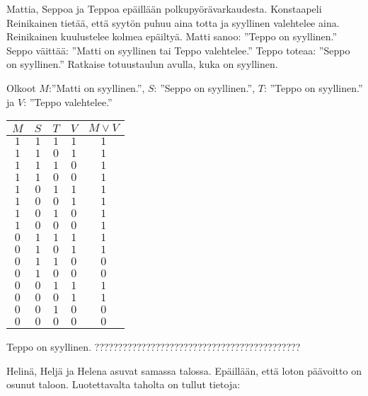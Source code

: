 \begin{kotitehtavasivu}
\begin{tehtava}
\end{tehtava}

\begin{tehtava}
     Mattia, Seppoa ja Teppoa epäillään polkupyörävarkaudesta. Konstaapeli Reinikainen tietää, että syytön puhuu aina totta ja syyllinen valehtelee aina. Reinikainen kuulustelee kolmea epäiltyä. Matti sanoo: ''Teppo on syyllinen.'' Seppo väittää: ''Matti on syyllinen tai Teppo valehtelee.'' Teppo toteaa: ''Seppo on syyllinen.'' Ratkaise totuustaulun avulla, kuka on syyllinen. 
    \begin{vastaus}
      Olkoot $M$:''Matti on syyllinen.'', $S$: ''Seppo on syyllinen.'', $T$: ''Teppo on syyllinen.'' ja $V$: ''Teppo valehtelee.''
      \begin{center}
		    \begin{tabular}{|c|c|c|c|c|}\hline
		    $M$ & $S$ & $T$ & $V$ & $M\lor V$ \\ \hline
		    $1$ & $1$ & $1$ & $1$ & $1$ \\ %
		    $1$ & $1$ & $0$ & $1$ & $1$ \\
		    $1$ & $1$ & $1$ & $0$ & $1$ \\
		    $1$ & $1$ & $0$ & $0$ & $1$ \\
		    $1$ & $0$ & $1$ & $1$ & $1$ \\
		    $1$ & $0$ & $0$ & $1$ & $1$ \\
		    $1$ & $0$ & $1$ & $0$ & $1$ \\
		    $1$ & $0$ & $0$ & $0$ & $1$ \\
		    $0$ & $1$ & $1$ & $1$ & $1$ \\
		    $0$ & $1$ & $0$ & $1$ & $1$ \\
		    $0$ & $1$ & $1$ & $0$ & $0$ \\
		    $0$ & $1$ & $0$ & $0$ & $0$ \\
		    $0$ & $0$ & $1$ & $1$ & $1$ \\
		    $0$ & $0$ & $0$ & $1$ & $1$ \\
		    $0$ & $0$ & $1$ & $0$ & $0$ \\
		    $0$ & $0$ & $0$ & $0$ & $0$ \\ \hline
\end{tabular}
\end{center}
Teppo on syyllinen. ???????????????????????????????????????????? %
    \end{vastaus}
    
\end{tehtava}

\begin{tehtava}
     Helinä, Heljä ja Helena asuvat samassa talossa. Epäillään, että loton päävoitto on osunut taloon. Luotettavalta taholta on tullut tietoja:


\end{tehtava}
\end{kotitehtavasivu}

